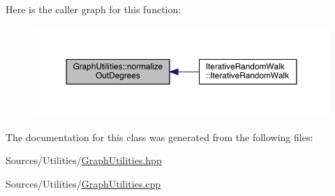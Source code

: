 Here is the caller graph for this function\+:
\nopagebreak
\begin{figure}[H]
\begin{center}
\leavevmode
\includegraphics[width=350pt]{class_graph_utilities_ae41ba7e07c1c11adf48583de7f72e8a8_icgraph}
\end{center}
\end{figure}




The documentation for this class was generated from the following files\+:\begin{DoxyCompactItemize}
\item 
Sources/\+Utilities/\hyperlink{_graph_utilities_8hpp}{Graph\+Utilities.\+hpp}\item 
Sources/\+Utilities/\hyperlink{_graph_utilities_8cpp}{Graph\+Utilities.\+cpp}\end{DoxyCompactItemize}
